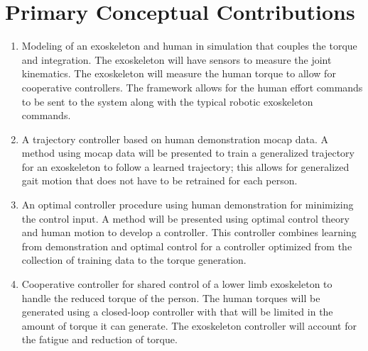 \section{Primary Conceptual Contributions}
\begin{enumerate}[wide, nosep, labelindent = 0pt, topsep = 1ex]
    \item  Modeling of an exoskeleton and human in simulation that couples the torque and integration. The exoskeleton will have sensors to measure the joint kinematics. The exoskeleton will measure the human torque to allow for cooperative controllers. The framework allows for the human effort commands to be sent to the system along with the typical robotic exoskeleton commands. 
    \item A trajectory controller based on human demonstration mocap data. A method using mocap data will be presented to train a generalized trajectory for an exoskeleton to follow a learned trajectory; this allows for generalized gait motion that does not have to be retrained for each person. 
    \item An optimal controller procedure using human demonstration for minimizing the control input. A method will be presented using optimal control theory and human motion to develop a controller. This controller combines learning from demonstration and optimal control for a controller optimized from the collection of training data to the torque generation. 
    \item Cooperative controller for shared control of a lower limb exoskeleton to handle the reduced torque of the person. The human torques will be generated using a closed-loop controller with that will be limited in the amount of torque it can generate. The exoskeleton controller will account for the fatigue and reduction of torque. 
\end{enumerate}


